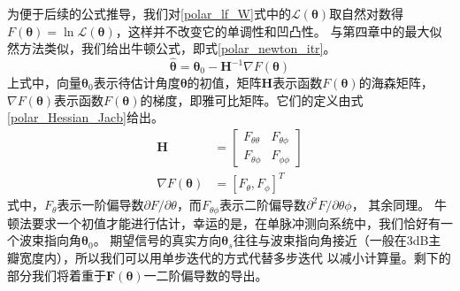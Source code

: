 \documentclass[master]{thesis-uestc}
\begin{document}
为便于后续的公式推导，我们对\eqref{polar_lf_W}式中的$\mathcal{L}(\bm{\theta})$取自然对数得
$F(\bm{\theta})=\ln\mathcal{L}(\bm{\theta})$，这样并不改变它的单调性和凹凸性。
与第四章中的最大似然方法类似，我们给出牛顿公式，即式\eqref{polar_newton_itr}。
\begin{equation}\label{polar_newton_itr}
    \hat{\bm{\theta}} = \bm{\theta}_0 - \bm{H}^{-1}\nabla F(\bm{\theta})
\end{equation}
上式中，向量$\bm{\theta}_0$表示待估计角度$\bm{\theta}$的初值，矩阵$\bm{H}$表示函数$F(\bm{\theta})$的海森矩阵，
$\nabla F(\bm{\theta})$表示函数$F(\bm{\theta})$的梯度，即雅可比矩阵。它们的定义由式\eqref{polar_Hessian_Jacb}给出。
\begin{subequations}\label{polar_Hessian_Jacb}
    \begin{align}
        \bm{H} &=
        \begin{bmatrix}
            F_{\theta\theta} & F_{\theta\phi} \\
            F_{\theta\phi}   & F_{\phi\phi}
        \end{bmatrix} \\
        \nabla F(\bm{\theta}) &= \left[F_\theta,F_\phi\right]^T
    \end{align}
\end{subequations}
式中，$F_\theta$表示一阶偏导数$\partial F/\partial\theta$，而$F_{\theta\phi}$表示二阶偏导数$\partial^2 F/\partial\theta\phi$，
其余同理。
牛顿法要求一个初值才能进行估计，幸运的是，在单脉冲测向系统中，我们恰好有一个波束指向角$\bm{\theta}_0$。
期望信号的真实方向$\bm{\theta}_s$往往与波束指向角接近（一般在3dB主瓣宽度内），所以我们可以用单步迭代的方式代替多步迭代
以减小计算量。剩下的部分我们将着重于$\bm{F}(\bm{\theta})$一二阶偏导数的导出。
\end{document}
